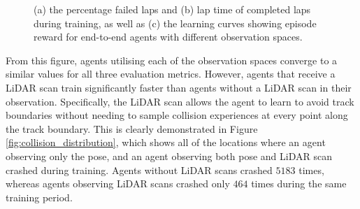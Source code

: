 \begin{figure}[htb!]
    \centering
    
    \caption[Learning curves of agents with different observation spaces]{(a) the percentage failed laps and (b) lap time of completed laps during training, as well as (c) the learning curves showing episode reward for end-to-end agents with different observation spaces.}
    \label{fig:obs_space}
\end{figure}

From this figure, agents utilising each of the observation spaces converge to a similar values for all three evaluation metrics.
However, agents that receive a LiDAR scan train significantly faster than agents without a LiDAR scan in their observation.
Specifically, the LiDAR scan allows the agent to learn to avoid track boundaries without needing to sample collision experiences at every point along the track boundary.
This is clearly demonstrated in Figure \ref{fig:collision_distribution}, which shows all of the locations where an agent observing only the pose, and an agent observing both pose and LiDAR scan crashed during training.
Agents without LiDAR scans crashed $5183$ times, whereas agents observing LiDAR scans crashed only $464$ times during the same training period.

